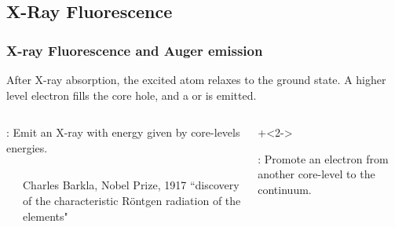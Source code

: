 \subsection{X-Ray Fluorescence}
\begin{frame} \frametitle{X-ray Fluorescence and Auger emission}

\begin{cenpage}{110mm}
  After X-ray absorption, the excited atom relaxes to the
  ground state.  A higher level electron fills the core hole, and a
  {} or {} is emitted.
\end{cenpage}

\vmm

  \begin{columns}[T]
      \begin{column}{55mm}
        {}:
        Emit an X-ray with energy given by core-levels energies.

       \hspace{4mm} 

        \begin{columns}
          \begin{column}{8mm}
          \end{column}
          \begin{column}{40mm}

            {\tiny{Charles Barkla, Nobel Prize, 1917 ``discovery of the characteristic R\"ontgen radiation of the elements"
                }}
          \end{column}
        \end{columns}

      \end{column}
      \begin{column}{55mm}
        \onslide+<2->

        {}:
        Promote an electron from another core-level to the continuum.

       \hspace{4mm} 

        \begin{columns}
          \begin{column}{8mm}
          \end{column}
          \begin{column}{40mm}


\end{column}
\end{columns}
\end{column}
\end{columns}
\end{frame}
